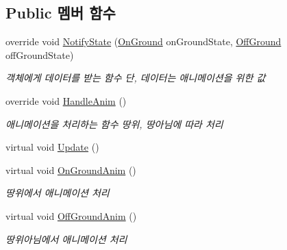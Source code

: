 \subsection*{Public 멤버 함수}
\begin{DoxyCompactItemize}
\item 
override void \mbox{\hyperlink{class_player_state_a59f3f64c24ba1b6e34e34cb23746ecb0}{Notify\+State}} (\mbox{\hyperlink{class_state_ab9eb1c1d81f1903b8486d1275e78b68e}{On\+Ground}} on\+Ground\+State, \mbox{\hyperlink{class_state_a7d945e793324c017a973205564cf1a56}{Off\+Ground}} off\+Ground\+State)
\begin{DoxyCompactList}\small\item\em 객체에게 데이터를 받는 함수 단, 데이터는 애니메이션을 위한 값 \end{DoxyCompactList}\item 
override void \mbox{\hyperlink{class_player_state_ae57c0c11c946d701bb1e0eb2bc7204dd}{Handle\+Anim}} ()
\begin{DoxyCompactList}\small\item\em 애니메이션을 처리하는 함수\textquotesingle{} 땅위, 땅아님에 따라 처리 \end{DoxyCompactList}\item 
virtual void \mbox{\hyperlink{class_state_ad3ecac701a93b8ef7e5365e0fc599243}{Update}} ()
\item 
virtual void \mbox{\hyperlink{class_state_adc5e7be4e977f0a64b29b01171eda8af}{On\+Ground\+Anim}} ()
\begin{DoxyCompactList}\small\item\em 땅위에서 애니메이션 처리 \end{DoxyCompactList}\item 
virtual void \mbox{\hyperlink{class_state_a2909a234430fa7752fadf2bb993ab5e2}{Off\+Ground\+Anim}} ()
\begin{DoxyCompactList}\small\item\em 땅위아님에서 애니메이션 처리 \end{DoxyCompactList}\end{DoxyCompactItemize}
